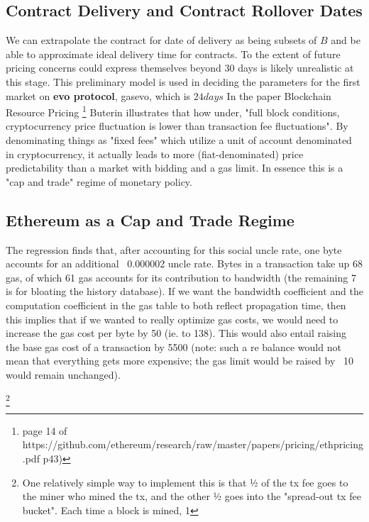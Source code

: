 \subsection{Contract Delivery and Contract Rollover Dates}
    \vspace{2mm}
We can extrapolate the contract for date of delivery as being subsets of $B$ and be able to 
approximate ideal delivery time for contracts. To the extent of future pricing concerns could 
express themselves beyond 30 days is  likely unrealistic at this stage. 
    \vspace{2mm}
This preliminary model is used in deciding the parameters for the first market on \textbf{evo 
protocol}, gasevo, which is $24 days$
    \vspace{2mm}
In the paper Blockchain Resource Pricing \footnote{page 14 of
https://github.com/ethereum/research/raw/master/papers/pricing/ethpricing.pdf p43)} Buterin
illustrates that how under, "full block conditions, cryptocurrency price fluctuation is lower than
transaction fee fluctuations". By denominating things as "fixed fees" which utilize a unit of
account denominated in cryptocurrency, it actually leads to more (fiat-denominated) price
predictability than a market with bidding and a gas limit. In essence this is a "cap and trade" regime of monetary
policy. 
    \vspace{2mm}

\subsection{Ethereum as a Cap and Trade Regime}
The regression finds that, after accounting for this social uncle rate, one byte accounts for an
additional ~0.000002 uncle rate. Bytes in a transaction take up 68 gas, of which 61 gas accounts
for its contribution to bandwidth (the remaining 7 is for bloating the history database). If we
want the bandwidth coefficient and the computation coefficient in the gas table to both reflect
propagation time, then this implies that if we wanted to really optimize gas costs, we would need
to increase the gas cost per byte by 50 (ie. to 138). This would also entail raising the base gas
cost of a transaction by 5500 (note: such a re balance would not mean that everything gets more
expensive; the gas limit would be raised by ~10%
would remain unchanged). 

\vspace{2mm}
\footnote{ One relatively simple way to implement this is that ½ of the tx fee goes to the miner
who mined the tx, and the other ½ goes into the "spread-out tx fee bucket". Each time a block is
mined, 1%
}

